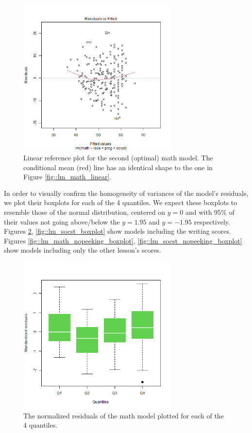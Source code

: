 \documentclass[10pt, a4paper]{article}
\begin{document}
	\begin{figure}
		\includegraphics[width=8cm]{lm_math_nopeek_linear_plot.png}
		\centering
		\caption{Linear reference plot for the second (optimal) math model. The conditional mean (red) line has an identical shape to the one in Figure \ref{fig::lm_math_linear}.}
		\label{fig::lm_math_nopeek_linear}
	\end{figure}
	
	In order to visually confirm the homogeneity of variances of the model's residuals, we plot their boxplots for each of the 4 quantiles. We expect these boxplots to resemble those of the normal distribution, centered on $y=0$ and with 95\% of their values not going above/below the $y=1.95$ and $y=-1.95$ respectively. Figures \ref{fig::lm_math_boxplot}, \ref{fig::lm_socst_boxplot} show models including the writing scores. Figures \ref{fig::lm_math_nopeeking_boxplot}, \ref{fig::lm_socst_nopeeking_boxplot} show models including only the other lesson's scores.
	
	\begin{figure}
		\includegraphics[width=8cm]{lm_math_residual_boxplot.png}
		\centering
		\caption{The normalized residuals of the math model plotted for each of the 4 quantiles.}
		\label{fig::lm_math_boxplot}
	\end{figure}
\end{document}
